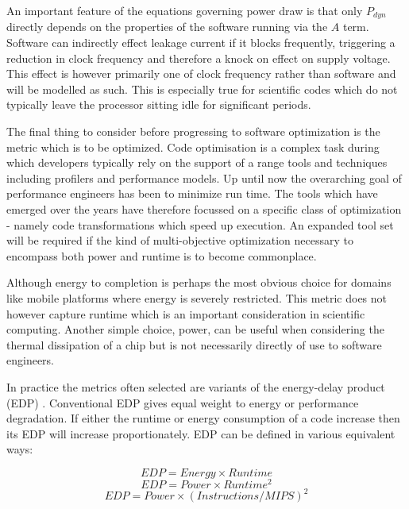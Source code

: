 An important feature of the equations governing power draw is that only $P_{dyn}$ directly depends on the properties of the software running via the $A$ term. Software can indirectly effect leakage current if it blocks frequently, triggering a reduction in clock frequency and therefore a knock on effect on supply voltage. This effect is however primarily one of clock frequency rather than software and will be modelled as such. This is especially true for scientific codes which do not typically leave the processor sitting idle for significant periods.

The final thing to consider before progressing to software optimization is the metric which is to be optimized. Code optimisation is a complex task during which developers typically rely on the support of a range tools and techniques including profilers and performance models. Up until now the overarching goal of performance engineers has been to minimize run time. The tools which have emerged over the years have therefore focussed on a specific class of optimization - namely code transformations which speed up execution. An expanded tool set will be required if the kind of multi-objective optimization necessary to encompass both power and runtime is to become commonplace.

Although energy to completion is perhaps the most obvious choice for domains like mobile platforms where energy is severely restricted. This metric does not however capture runtime which is an important consideration in scientific computing. Another simple choice, power, can be useful when considering the thermal dissipation of a chip but is not necessarily directly of use to software engineers.

In practice the metrics often selected are variants of the energy-delay product (EDP) \cite{todo:book85}. Conventional EDP gives equal weight to energy or performance degradation. If either the runtime or energy consumption of a code increase then its EDP will increase proportionately. EDP can be defined in various equivalent ways: 

\begin{equation}
EDP = Energy \times Runtime
\end{equation}
\begin{equation}
EDP = Power \times Runtime^{2}
\end{equation}
\begin{equation}
EDP = Power \times (Instructions / MIPS)^{2}
\end{equation}


